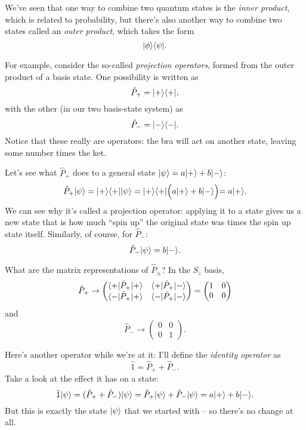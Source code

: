 We've seen that one way to combine two quantum states is the \emph{inner product}, which is related to probability, but there's also another way to combine two states called an \emph{outer product}, which takes the form
\[
| \phi \rangle\langle \psi |.
\]

For example, consider the so-called \emph{projection operators}, formed from the outer product of a basis state.  One possibility is written as
\begin{equation}
\hat{P}_+ = | + \rangle \langle + |, 
\end{equation}
with the other (in our two basis-state system) as
\begin{equation}
\hat{P}_- = | - \rangle \langle - |.
\end{equation}
Notice that these really are operators:  the bra will act on another state, leaving some number times the ket.  

Let's see what $\hat{P}_+$ does to a general state $| \psi \rangle = a| + \rangle + b| - \rangle$:
\[
\hat{P}_+ | \psi \rangle = | + \rangle \langle + | | \psi \rangle = | + \rangle \langle + | \Bigl( a| + \rangle + b| - \rangle \Bigl) = a | + \rangle.
\]
We can see why it's called a projection operator:  applying it to a state gives us a new state that is how much ``spin up'' the original state was times the spin up state itself.  Similarly, of course, for $\hat{P}_-$:
\[
\hat{P}_- | \psi \rangle = b | - \rangle.
\]

What are the matrix representations of $\hat{P}_\pm$?  In the $S_z$ basis,
\begin{equation}
\hat{P}_+ \to 
\begin{pmatrix}
\langle + | \hat{P}_+ | + \rangle & \langle + | \hat{P}_+ | - \rangle \\
\langle - | \hat{P}_+ | + \rangle & \langle - | \hat{P}_+ | - \rangle
\end{pmatrix}
 = 
\begin{pmatrix}
1 & 0 \\ 0 & 0
\end{pmatrix}
\end{equation}
and
\begin{equation}
\hat{P}_- \to 
\begin{pmatrix}
0 & 0 \\ 0 & 1
\end{pmatrix}.
\end{equation}

Here's another operator while we're at it:  I'll define the \emph{identity operator} as 
\begin{equation}
\hat{1} = \hat{P}_+ + \hat{P}_-.
\end{equation}
Take a look at the effect it has on a state:
\[
\hat{1} | \psi \rangle = (\hat{P}_+ + \hat{P}_-) | \psi \rangle = \hat{P}_+| \psi \rangle + \hat{P}_-| \psi \rangle = a| + \rangle + b| - \rangle.
\]
But this is exactly the state $| \psi \rangle$ that we started with -- so there's no change at all.

